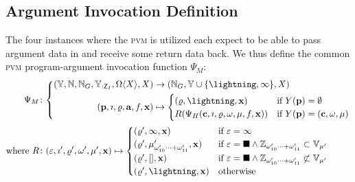 \subsection{Argument Invocation Definition}

The four instances where the \textsc{pvm} is utilized each expect to be able to pass argument data in and receive some return data back. We thus define the common \textsc{pvm} program-argument invocation function $\Psi_M$:
\begin{align}
  \Psi_M&\colon \left\{\begin{aligned}
    (\Y, \N, \N_G, \Y_{:\mathsf{Z}_I}, \Omega\langle X \rangle, X) &\to (\N_G, \Y \cup \{\panic, \oog\}, X)\\
    (\mathbf{p}, \imath, \gascounter, \mathbf{a}, f, \mathbf{x}) &\mapsto \begin{cases}
      (\gascounter, \panic, \mathbf{x}) &\when Y(\mathbf{p}) = \none\\
      R(\Psi_H(\mathbf{c}, \imath, \gascounter, \registers, \mem, f, \mathbf{x})) &\when Y(\mathbf{p}) = (\mathbf{c}, \registers, \mem)
    \end{cases}
  \end{aligned}\right.\\
  \where R&\colon (\varepsilon, \imath', \gascounter', \registers', \mem', \mathbf{x}) \mapsto \begin{cases}
    (\gascounter', \oog, \mathbf{x}) &\when \varepsilon = \oog \\
    (\gascounter', \memory'_{\registers'_{10}\dots+\registers'_{11}}, \mathbf{x}) &\when \varepsilon = \halt \wedge \mathbb{Z}_{\registers'_{10}\dots+\registers'_{11}} \subset \mathbb{V}_{\mem'} \\
    (\gascounter', [], \mathbf{x}) &\when \varepsilon = \halt \wedge \mathbb{Z}_{\registers'_{10}\dots+\registers'_{11}} \not\subset \mathbb{V}_{\mem'} \\
    (\gascounter', \panic, \mathbf{x}) &\otherwise \\
  \end{cases}
\end{align}
